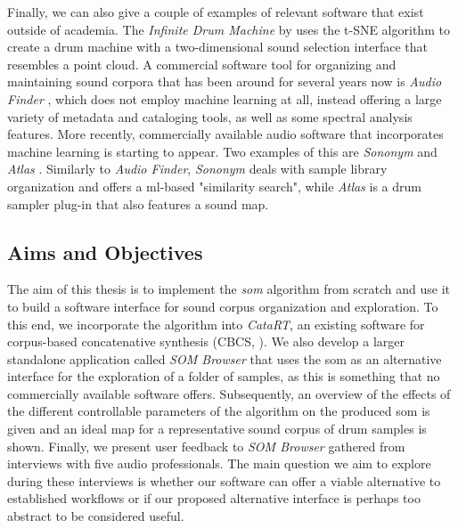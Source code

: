 Finally, we can also give a couple of examples of relevant software that exist
outside of academia. The \textit{Infinite Drum Machine} by \citet{mcdonald2017}
uses the t-SNE algorithm \citep{maaten2008} to create a drum machine with a
two-dimensional sound selection interface that resembles a point cloud. A
commercial software tool for organizing and maintaining sound corpora that has
been around for several years now is \textit{Audio Finder}
\citep{audiofinder2019}, which does not employ machine learning at all, instead
offering a large variety of metadata and cataloging
tools, as well as some spectral analysis features. More recently, commercially
available audio software that incorporates machine learning is starting to
appear. Two examples of this are \textit{Sononym} \citep{nielsen2018} and
\textit{Atlas} \citep{atlas2018}. Similarly to \textit{Audio Finder},
\textit{Sononym} deals with sample library organization and offers a
\gls{ml}-based "similarity search", while \textit{Atlas} is a drum sampler
plug-in that also features a sound map.

\subsection{Aims and Objectives}
\label{subsec:aims}

The aim of this thesis is to implement the \textit{\gls{som}} algorithm from
scratch and use it to build a software interface for sound corpus organization
and exploration. To this end, we incorporate the algorithm into \textit{CataRT},
an existing software for corpus-based concatenative synthesis (CBCS,
\citet{schwarz2006}). We also develop a larger standalone application called
\textit{SOM Browser} that uses the \gls{som} as an alternative interface for the
exploration of a folder of samples, as this is something that no commercially
available software offers. Subsequently, an overview of the
effects of the different controllable parameters of the algorithm on the
produced \gls{som} is given and an ideal map for a representative sound corpus
of drum samples is shown. Finally, we present user feedback to
\textit{SOM Browser} gathered from interviews with five audio professionals.
The main question we aim to explore during these interviews is whether our
software can offer a viable alternative to established workflows or if our
proposed alternative interface is perhaps too abstract to be considered useful.
